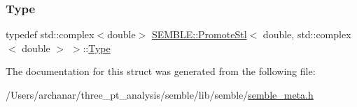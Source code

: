 \mbox{\label{structSEMBLE_1_1PromoteStl_3_01double_00_01std_1_1complex_3_01double_01_4_01_4_a941bd5815d06151138c394c3272c285e}} 
\subsubsection{\texorpdfstring{Type}{Type}\hspace{0.1cm}{\footnotesize\ttfamily [2/2]}}
{\footnotesize\ttfamily typedef std\+::complex$<$double$>$ \mbox{\hyperlink{structSEMBLE_1_1PromoteStl}{S\+E\+M\+B\+L\+E\+::\+Promote\+Stl}}$<$ double, std\+::complex$<$ double $>$ $>$\+::\mbox{\hyperlink{structSEMBLE_1_1PromoteStl_3_01double_00_01std_1_1complex_3_01double_01_4_01_4_a941bd5815d06151138c394c3272c285e}{Type}}}



The documentation for this struct was generated from the following file\+:\begin{DoxyCompactItemize}
\item 
/\+Users/archanar/three\+\_\+pt\+\_\+analysis/semble/lib/semble/\mbox{\hyperlink{lib_2semble_2semble__meta_8h}{semble\+\_\+meta.\+h}}\end{DoxyCompactItemize}
